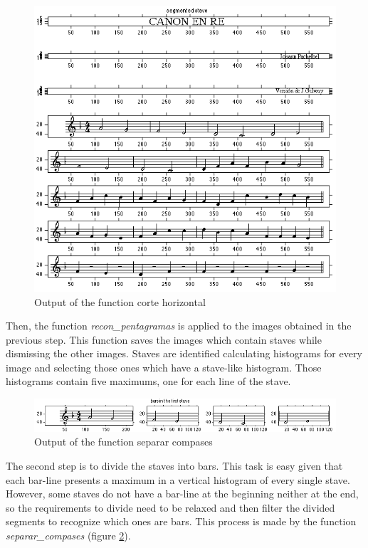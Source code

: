 \documentclass[10pt, a4paper]{article}
\begin{document}
\begin{figure}[h!]
  \centering
    \includegraphics[scale=0.3]{./img/img1.png}
  \caption{Output of the function corte horizontal}
  \label{fig1}
\end{figure}

Then, the function \emph{recon\_pentagramas} is applied to the images obtained in the previous step. This function saves the images which contain staves while dismissing the other images. Staves are identified calculating histograms for every image and selecting those ones which have a stave-like histogram. Those histograms contain five maximums, one for each line of the stave.

\begin{figure}[h!]
  \centering
    \includegraphics[scale=0.5]{./img/img2.png}
  \caption{Output of the function separar compases}
  \label{fig2}
\end{figure}


The second step is to divide the staves into bars. This task is easy given that each bar-line presents a maximum in a vertical histogram of every single stave. However, some staves do not have a bar-line at the beginning neither at the end, so the requirements to divide need to be relaxed and then filter the divided segments to recognize which ones are bars. This process is made by the function \emph{separar\_compases} (figure \ref{fig2}).
\end{document}
